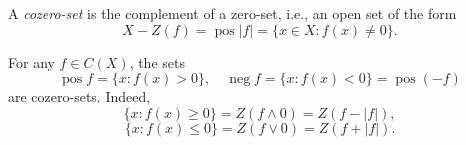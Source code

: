 A \emph{cozero-set} is the complement of a zero-set, i.e., an open set of the form
$$X - Z(f) = \operatorname{pos} |f| = \{x \in X : f(x) \neq 0\}.$$

For any $f \in C(X)$, the sets
$$\operatorname{pos} f = \{x: f(x) > 0\}, \quad \operatorname{neg} f = \{x: f(x) < 0\} = \operatorname{pos}(-f)$$
are cozero-sets. Indeed,
$$\{x: f(x) \geq 0\} = Z(f \wedge 0) = Z(f - |f|),$$
$$\{x: f(x) \leq 0\} = Z(f \vee 0) = Z(f + |f|).$$
